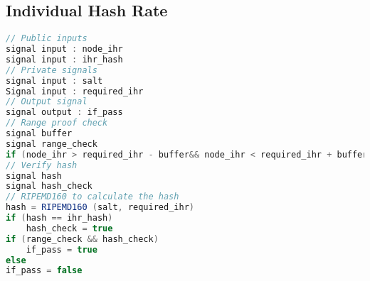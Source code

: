 \documentclass[../Bitcoin Blink.tex]{subfiles}
\begin{document}
\normalsize
\subsection{Individual Hash Rate}
\begin{lstlisting}[language=Java, caption=IHR Circuit]
// Public inputs
signal input : node_ihr 
signal input : ihr_hash
// Private signals 
signal input : salt
Signal input : required_ihr
// Output signal
signal output : if_pass
// Range proof check 
signal buffer
signal range_check
if (node_ihr > required_ihr - buffer&& node_ihr < required_ihr + buffer) : range_check = true
// Verify hash
signal hash
signal hash_check
// RIPEMD160 to calculate the hash
hash = RIPEMD160 (salt, required_ihr)
if (hash == ihr_hash)
	hash_check = true
if (range_check && hash_check)
	if_pass = true
else 
if_pass = false
\end{lstlisting}
\end{document}
